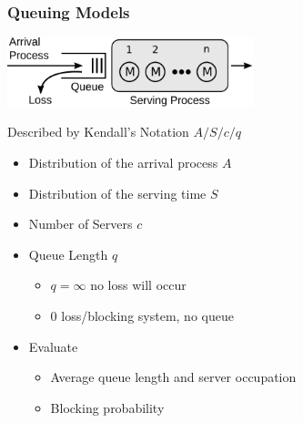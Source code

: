 \documentclass{beamer}
\begin{document}
\begin{frame}
	\frametitle{Queuing Models}

	\begin{center}
		\includegraphics[height=2cm]{figures/kendall-model.pdf}
	\end{center}

	Described by Kendall's Notation $A/S/c/q$
	\begin{itemize}
	\item Distribution of the arrival process $A$
	\item Distribution of the serving time $S$
	\item Number of Servers $c$
	\item Queue Length $q$
	\begin{itemize}
		\item $q=\infty$ no loss will occur
		\item $0$ loss/blocking system, no queue
	\end{itemize}
	\item Evaluate
		\begin{itemize}
			\item Average queue length and server occupation
			\item Blocking probability
		\end{itemize}
	\end{itemize}
\end{frame}

\setcounter{framenumber}{\value{finalframe}}
\end{document}
